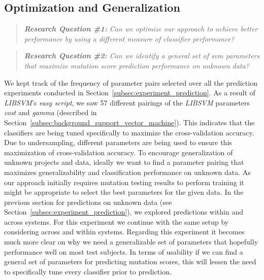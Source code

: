 \subsection{Optimization and Generalization}
\label{subsec:experiment_optimization_generalization}
\begin{quote}
  \emph{\textbf{Research Question \#1:} Can we optimize our approach to achieve better performance by using a different measure of classifier performance?}
\end{quote}

\begin{quote}
  \emph{\textbf{Research Question \#2:} Can we identify a general set of \gls{svm} parameters that maximize mutation score prediction performance on unknown data?}
\end{quote}

\noindent
We kept track of the frequency of parameter pairs selected over all the prediction experiments conducted in Section~\ref{subsec:experiment_prediction}. As a result of \emph{LIBSVM}'s \emph{easy script}, we saw 57 different pairings of the \emph{LIBSVM} parameters \emph{cost} and \emph{gamma} (described in Section~\ref{subsec:background_support_vector_machine}). This indicates that the classifiers are being tuned specifically to maximize the cross-validation accuracy. Due to undersampling, different parameters are being used to ensure this maximization of cross-validation accuracy. To encourage generalization of unknown projects and data, ideally we want to find a parameter pairing that maximizes generalizability and classification performance on unknown data. As our approach initially requires mutation testing results to perform training it might be appropriate to select the best parameters for the given data. In the previous section for predictions on unknown data (see Section~\ref{subsec:experiment_prediction}), we explored predictions within and across systems. For this experiment we continue with the same setup by considering across and within systems. Regarding this experiment it becomes much more clear on why we need a generalizable set of parameters that hopefully performance well on most test subjects. In terms of usability if we can find a general set of parameters for predicting mutation scores, this will lessen the need to specifically tune every classifier prior to prediction.

